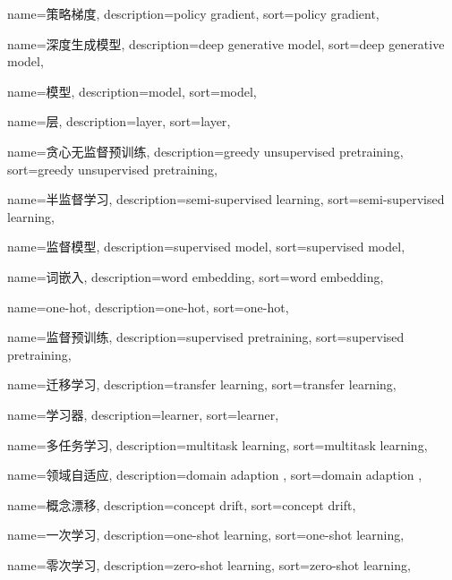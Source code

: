 {
  name=策略梯度,
  description={policy gradient},
  sort={policy gradient},
}

{
  name=深度生成模型,
  description={deep generative model},
  sort={deep generative model},
}

{
  name=模型,
  description={model},
  sort={model},
}

{
  name=层,
  description={layer},
  sort={layer},
}

{
  name=贪心无监督预训练,
  description={greedy unsupervised pretraining},
  sort={greedy unsupervised pretraining},
}

{
  name=半监督学习,
  description={semi-supervised learning},
  sort={semi-supervised learning},
}

{
  name=监督模型,
  description={supervised model},
  sort={supervised model},
}

{
  name=词嵌入,
  description={word embedding},
  sort={word embedding},
}

{
  name=one-hot,
  description={one-hot},
  sort={one-hot},
}

{
  name=监督预训练,
  description={supervised pretraining},
  sort={supervised pretraining},
}

{
  name=迁移学习,
  description={transfer learning},
  sort={transfer learning},
}

{
  name=学习器,
  description={learner},
  sort={learner},
}

{
  name=多任务学习,
  description={multitask learning},
  sort={multitask learning},
}

{
  name=领域自适应,
  description={domain adaption}  ,
  sort={domain adaption}  ,
}

{
  name=概念漂移,
  description={concept drift},
  sort={concept drift},
}

{
  name=一次学习,
  description={one-shot learning},
  sort={one-shot learning},
}

{
  name=零次学习,
  description={zero-shot learning},
  sort={zero-shot learning},
}

